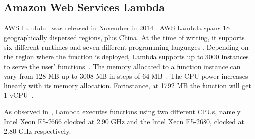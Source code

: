 
\subsection{Amazon Web Services Lambda}\label{sec:ss:aws}

\gls{AWS} Lambda~\cite{AWSLambda} was released in November in 2014 \cite{AWSLambdaRelease}. 
\gls{AWS} Lambda spans 18 geographically dispersed regions, plus China\cite{AWSRegions}. 
At the time of writing, it supports six different runtimes and seven different programming languages \cite{AWSLambdaLanguages}. 
Depending on the region where the function is deployed, Lambda supports up to 3000 instances to serve the user' functions~\cite{AWSLambdaScaling}. 
The memory allocated to a function instance can vary from 128 \gls{MB} up to 3008 \gls{MB} in steps of 64 \gls{MB}~\cite{AWSLambdaConfig}. 
The \gls{CPU} power increases linearly with its memory allocation.
Forinstance, at 1792 \gls{MB} the function will get 1 \gls{vCPU}~\cite{AWSLambdaConfig}. 

As observed in~\cite{216063}, Lambda executes functions using two different \gls{CPU}s, namely Intel Xeon E5-2666 clocked at 2.90 \gls{GHz}  and the Intel Xeon E5-2680, clocked at 2.80 \gls{GHz} respectively. 

